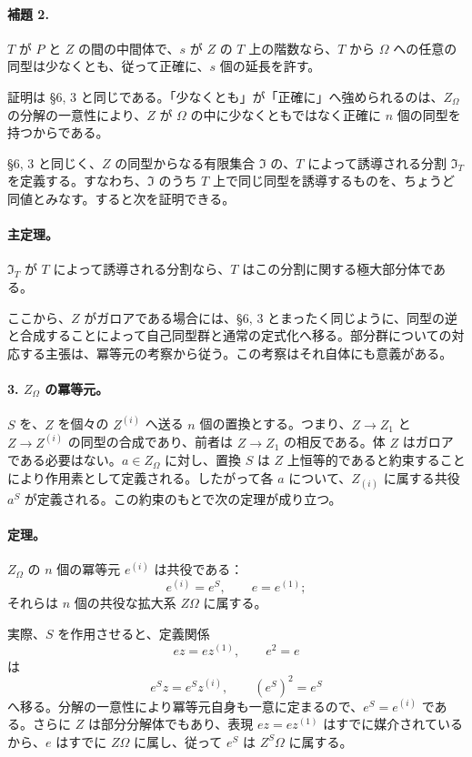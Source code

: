 \paragraph{補題 2.}
\(T\) が \(P\) と \(Z\) の間の中間体で、\(s\) が \(Z\) の \(T\) 上の階数なら、\(T\) から \(\Omega\) への任意の同型は少なくとも、従って正確に、\(s\) 個の延長を許す。

証明は §6, 3 と同じである。「少なくとも」が「正確に」へ強められるのは、\(Z_\Omega\) の分解の一意性により、\(Z\) が \(\Omega\) の中に少なくともではなく正確に \(n\) 個の同型を持つからである。

§6, 3 と同じく、\(Z\) の同型からなる有限集合 \(\mathfrak I\) の、\(T\) によって誘導される分割 \(\mathfrak I_T\) を定義する。すなわち、\(\mathfrak I\) のうち \(T\) 上で同じ同型を誘導するものを、ちょうど同値とみなす。すると次を証明できる。

\paragraph{主定理。}
\(\mathfrak I_T\) が \(T\) によって誘導される分割なら、\(T\) はこの分割に関する極大部分体である。

ここから、\(Z\) がガロアである場合には、§6, 3 とまったく同じように、同型の逆と合成することによって自己同型群と通常の定式化へ移る。部分群についての対応する主張は、冪等元の考察から従う。この考察はそれ自体にも意義がある。

\paragraph{3. \(Z_\Omega\) の冪等元。}
\(S\) を、\(Z\) を個々の \(Z^{(i)}\) へ送る \(n\) 個の置換とする。つまり、\(Z\to Z_1\) と \(Z\to Z^{(i)}\) の同型の合成であり、前者は \(Z\to Z_1\) の相反である。体 \(Z\) はガロアである必要はない。\(a\in Z_\Omega\) に対し、置換 \(S\) は \(Z\) 上恒等的であると約束することにより作用素として定義される。したがって各 \(a\) について、\(Z_{(i)}\) に属する共役 \(a^S\) が定義される。この約束のもとで次の定理が成り立つ。

\paragraph{定理。}
\(Z_\Omega\) の \(n\) 個の冪等元 \(e^{(i)}\) は共役である：
\[
        e^{(i)}=e^S,
        \qquad e=e^{(1)};
\]
それらは \(n\) 個の共役な拡大系 \(Z\Omega\) に属する。

実際、\(S\) を作用させると、定義関係
\[
        ez=ez^{(1)},
        \qquad e^2=e
\]
は
\[
        e^S z=e^S z^{(i)},
        \qquad (e^S)^2=e^S
\]
へ移る。分解の一意性により冪等元自身も一意に定まるので、\(e^S=e^{(i)}\) である。さらに \(Z\) は部分分解体でもあり、表現 \(ez=ez^{(1)}\) はすでに媒介されているから、\(e\) はすでに \(Z\Omega\) に属し、従って \(e^S\) は \(Z^S\Omega\) に属する。

